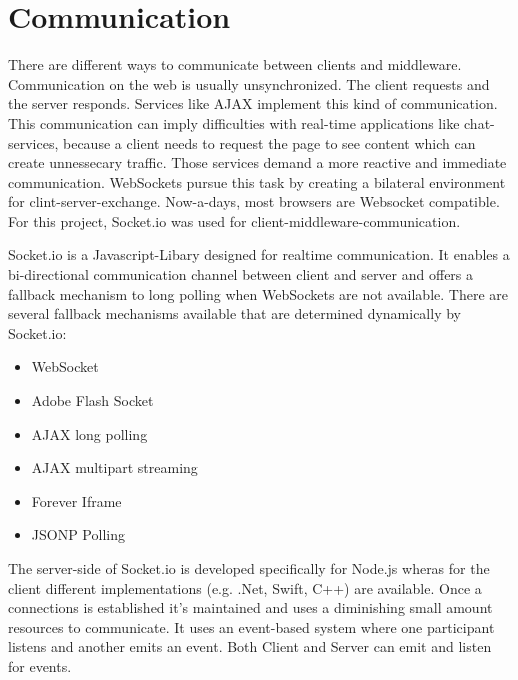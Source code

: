 \section{Communication}
There are different ways to communicate between clients and middleware. 
Communication on the web is usually unsynchronized. The client requests and the server responds. Services like AJAX \parencite{ajax} implement this kind of communication.
This communication can imply difficulties with real-time applications like chat-services, because a client needs to request the page to see content which can create unnessecary traffic.  
Those services demand a more reactive and immediate communication. 
WebSockets pursue this task by creating a bilateral environment for clint-server-exchange. 
Now-a-days, most browsers are Websocket compatible.
For this project, Socket.io was used for client-middleware-communication.

Socket.io is a Javascript-Libary designed for realtime communication. 
It enables a bi-directional communication channel between client and server and offers a fallback mechanism to long polling when WebSockets are not available.
There are several fallback mechanisms available that are determined dynamically by Socket.io:
\begin{itemize}
    \item WebSocket
    \item Adobe Flash Socket
    \item AJAX long polling
    \item AJAX multipart streaming
    \item Forever Iframe
    \item JSONP Polling
\end{itemize}

The server-side of Socket.io is developed  specifically for Node.js wheras for the client different implementations (e.g. .Net, Swift, C++)\parencite{socketioClients} are available.
Once a connections is established it's maintained and uses a diminishing small amount resources to communicate. 
It uses an event-based system where one participant listens and another emits an event. 
Both Client and Server can emit and listen for events.
